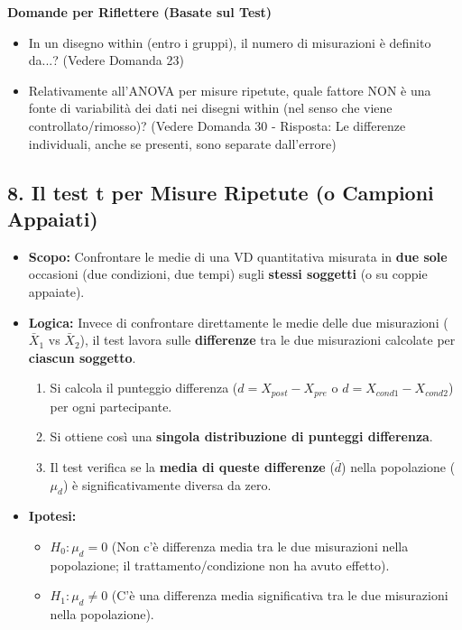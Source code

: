 \documentclass[12pt, a4paper]{article}
\newenvironment{reflectionbox}{%
    \medskip
    \begin{framed}\par\noindent
    \textbf{\color{boxtitlecolor}Domande per Riflettere (Basate sul Test)} \par
    \begin{itemize}[leftmargin=*, label=$\blacktriangleright$]
}{%
    \end{itemize}\par
    \end{framed}
    \medskip
}
\newcommand{\Hnull}{H_0} %
\newcommand{\Halt}{H_1} %
\begin{document}
\begin{reflectionbox}
    \item In un disegno within (entro i gruppi), il numero di misurazioni è definito da...? (Vedere Domanda 23)
    \item Relativamente all'ANOVA per misure ripetute, quale fattore NON è una fonte di variabilità dei dati nei disegni within (nel senso che viene controllato/rimosso)? (Vedere Domanda 30 - Risposta: Le differenze individuali, anche se presenti, sono separate dall'errore)
\end{reflectionbox}


\subsection*{8. Il test t per Misure Ripetute (o Campioni Appaiati)}
\begin{itemize}
    \item \textbf{Scopo:} Confrontare le medie di una VD quantitativa misurata in \textbf{due sole} occasioni (due condizioni, due tempi) sugli \textbf{stessi soggetti} (o su coppie appaiate).
    \item \textbf{Logica:} Invece di confrontare direttamente le medie delle due misurazioni ($\bar{X}_1$ vs $\bar{X}_2$), il test lavora sulle \textbf{differenze} tra le due misurazioni calcolate per \textbf{ciascun soggetto}.
        \begin{enumerate}
            \item Si calcola il punteggio differenza ($d = X_{post} - X_{pre}$ o $d = X_{cond1} - X_{cond2}$) per ogni partecipante.
            \item Si ottiene così una \textbf{singola distribuzione di punteggi differenza}.
            \item Il test verifica se la \textbf{media di queste differenze} ($\bar{d}$) nella popolazione ($\mu_d$) è significativamente diversa da zero.
        \end{enumerate}
    \item \textbf{Ipotesi:}
        \begin{itemize}
            \item $\Hnull: \mu_d = 0$ (Non c'è differenza media tra le due misurazioni nella popolazione; il trattamento/condizione non ha avuto effetto).
            \item $\Halt: \mu_d \neq 0$ (C'è una differenza media significativa tra le due misurazioni nella popolazione).
        \end{itemize}

\end{itemize}
\end{document}

